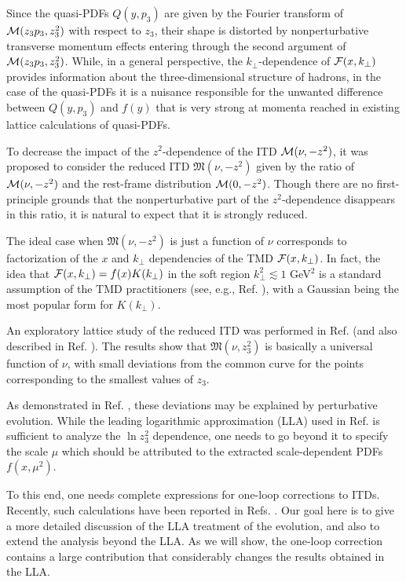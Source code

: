  Since the quasi-PDFs $Q(y,p_3)$ are given by
 the Fourier transform of ${\cal M} (z_3 p_3, z_3^2)$
 with respect to $z_3$, their shape  is distorted by nonperturbative
 transverse momentum effects  entering through the second argument of
  ${\cal M} (z_3 p_3, z_3^2)$.
 While,   in a general perspective, the
 \mbox{$k_\perp$-dependence}  of  ${\cal F} (x, k_\perp)$
provides information about the three-dimensional structure
of hadrons, in the case of the quasi-PDFs it
is a nuisance responsible for the unwanted  difference between
$Q(y,p_3)$ and $f(y)$ that is very strong at momenta reached in
existing lattice calculations of quasi-PDFs.

To decrease the impact of the $z^2$-dependence of the
ITD ${\cal M} (\nu, -z^2)$, it was proposed  \cite{Radyushkin:2017cyf}
to consider the reduced ITD ${\mathfrak M} (\nu, -z^2)$
given by the ratio of  ${\cal M} (\nu, -z^2)$ and the rest-frame
distribution  ${\cal M} (0, -z^2)$.
Though  there are no first-principle grounds
that the nonperturbative part of the \mbox{$z^2$-dependence}  disappears in this ratio,
it is natural to expect that it is strongly reduced.

The ideal case when ${\mathfrak M} (\nu, -z^2)$ is  just a function
of $\nu$  corresponds to factorization
of the $x$ and $k_\perp$ dependencies of the TMD
${\cal F} (x, k_\perp)$.  In fact, the idea that ${\cal F} (x, k_\perp) = f(x) K(k_\perp)$
in the soft region $k_\perp^2 \lesssim 1$ GeV$^2$  is
a standard assumption of the TMD practitioners  (see, e.g., Ref. \cite{Anselmino:2013lza}),
with a Gaussian being the most popular form for
$K(k_\perp)$.

An exploratory lattice study of the reduced ITD
was  performed in Ref. \cite{Orginos:2017kos} (and also described in Ref.
\cite{Karpie:2017bzm}).  The results show that
${\mathfrak M} (\nu, z_3^2)$ is basically a universal
function of $\nu$, with small deviations from the common curve
for the points corresponding to the smallest values of $z_3$.

As demonstrated in Ref. \cite{Orginos:2017kos}, these
deviations may be explained by  perturbative evolution.
While  the leading logarithmic approximation (LLA)
used in Ref.  \cite{Orginos:2017kos}  is  sufficient to analyze the
$\ln z_3^2$ dependence,
one needs to go   beyond it to
specify the scale $\mu$  which should be attributed
to the extracted scale-dependent PDFs $f(x,\mu^2)$.



To this end,  one needs complete expressions for one-loop corrections to ITDs.
Recently,  such  calculations have been reported  in Refs.
 \cite{Ji:2017rah,Radyushkin:2017lvu}.
Our goal here is to give a more detailed discussion
of the LLA  treatment of the evolution,
and also to extend the  analysis
beyond the LLA.
As we will  show,  the one-loop correction contains a large
 contribution  that  considerably changes the results
 obtained in the LLA.


